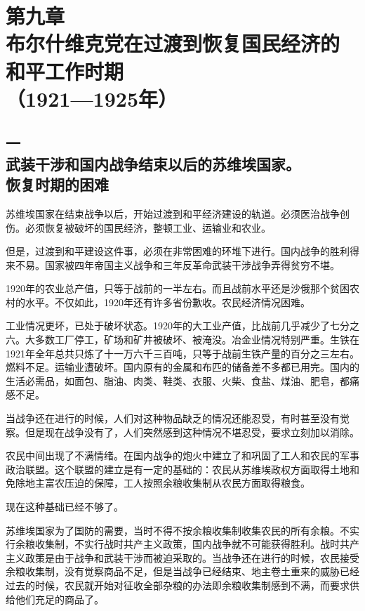 \section[第九章\q 布尔什维克党在过渡到恢复国民经济的和平工作时期（1921—1925年）]{第九章\\ 布尔什维克党在过渡到恢复国民经济的\\和平工作时期 \\{（1921—1925年）}}

\subsection[一\q 武装干涉和国内战争结束以后的苏维埃国家。恢复时期的困难]{一\\武装干涉和国内战争结束以后的苏维埃国家。\\恢复时期的困难}

苏维埃国家在结束战争以后，开始过渡到和平经济建设的轨道。必须医治战争创伤。必须恢复被破坏的国民经济，整顿工业、运输业和农业。

但是，过渡到和平建设这件事，必须在非常困难的环堆下进行。国内战争的胜利得来不易。国家被四年帝国主义战争和三年反革命武装干涉战争弄得贫穷不堪。

1920年的农业总产值，只等于战前的一半左右。而且战前水平还是沙俄那个贫困农村的水平。不仅如此，1920年还有许多省份歉收。农民经济情况困难。

工业情况更坏，已处于破坏状态。1920年的大工业产值，比战前几乎减少了七分之六。大多数工厂停工，矿场和矿井被破坏、被淹没。冶金业情况特别严重。生铁在1921年全年总共只炼了十一万六千三百吨，只等于战前生铁产量的百分之三左右。燃料不足。运输业遭破坏。国内原有的金属和布匹的储备差不多都已用完。国内的生活必需品，如面包、脂油、肉类、鞋类、衣服、火柴、食盐、煤油、肥皂，都痛感不足。

当战争还在进行的时候，人们对这种物品缺乏的情况还能忍受，有时甚至没有觉察。但是现在战争没有了，人们突然感到这种情况不堪忍受，要求立刻加以消除。

农民中间出现了不满情绪。在国内战争的炮火中建立了和巩固了工人和农民的军事政治联盟。这个联盟的建立是有一定的基础的：农民从苏维埃政权方面取得土地和免除地主富农压迫的保障，工人按照余粮收集制从农民方面取得粮食。

现在这种基础已经不够了。

苏维埃国家为了国防的需要，当时不得不按余粮收集制收集农民的所有余粮。不实行余粮收集制，不实行战时共产主义政策，国内战争就不可能获得胜利。战时共产主义政策是由于战争和武装干涉而被迫采取的。当战争还在进行的时候，农民接受余粮收集制，没有觉察商品不足，但是当战争已经结束、地主卷土重来的威胁已经过去的时候，农民就开始对征收全部杂粮的办法即余粮收集制感到不满，而要求供给他们充足的商品了。

